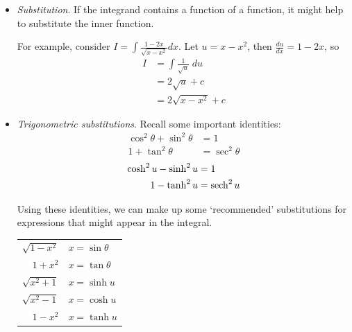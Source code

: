 \documentclass{../../template/note}
\begin{document}
    \begin{itemize}
        \item \emph{Substitution}. If the integrand contains a function of a function, it might help to substitute the inner function.
        
        For example, consider \(I = \int \frac{1-2x}{\sqrt{x-x^2}} dx\). Let \(u=x-x^2\), then \(\frac{du}{dx} = 1-2x\), so
        \begin{align*}
            I &= \int \frac{1}{\sqrt u}\; du \\
            &= 2\sqrt u + c \\
            &= 2\sqrt{x-x^2} + c
        \end{align*}

        \item \emph{Trigonometric substitutions}. Recall some important identities:
        \begin{align*}
            \cos^2 \theta + \sin^2 \theta &= 1 \\
            1 + \tan^2 \theta &= \sec^2 \theta 
        \end{align*}
        \begin{align*}
            \cosh^2 u - \sinh^2 u &= 1 \\
            1 - \tanh^2 u &= \operatorname{sech}^2 u
        \end{align*}

        Using these identities, we can make up some `recommended' substitutions for expressions that might appear in the integral.

        \begin{center}
        
            \begin{tabular}{r l}
                \(\sqrt{1-x^2}\) & \(x = \sin \theta\) \\
                \(1 + x^2\) & \(x = \tan \theta\) \\
                \(\sqrt{x^2 + 1}\) & \(x = \sinh u\) \\
                \(\sqrt{x^2 - 1}\) & \(x = \cosh u\) \\
                \(1-x^2\) & \(x = \tanh u\) \\
            \end{tabular}
            
        \end{center}
        

\end{itemize}
\end{document}
